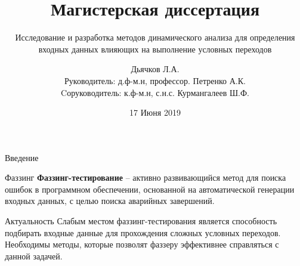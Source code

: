 \documentclass[10pt]{beamer}
\title{Магистерская диссертация}
\subtitle{Исследование и разработка методов динамического анализа для определения входных данных влияющих на выполнение условных переходов}
\author{Дьячков Л.А.\\[3mm]{\small Руководитель: д.ф-м.н, профессор. Петренко А.К.}\\[1mm]
{\small Cоруководитель: к.ф-м.н, с.н.с. Курмангалеев Ш.Ф.}\\[3mm]
}
\institute{ИСП РАН}
\date{17 Июня 2019}
\begin{document}
\maketitle



\begin{frame}{Введение}
  \begin{block}{Фаззинг}
  \textbf{Фаззинг-тестирование} -- активно развивающийся метод для поиска ошибок в программном обеспечении, основанной на автоматической генерации входных данных, с целью поиска аварийных завершений.
  \end{block}

  \begin{block}{Актуальность}
  Слабым местом фаззинг-тестирования является способность подбирать входные данные для прохождения сложных условных переходов. Необходимы методы, которые позволят фаззеру эффективнее справляться с данной задачей.

  \end{block}
\end{frame}
\end{document}
